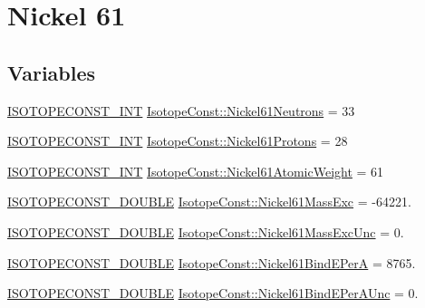\hypertarget{group___isotope_const-_nickel-_ni61}{}\section{Nickel 61}
\label{group___isotope_const-_nickel-_ni61}
\subsection*{Variables}
\begin{DoxyCompactItemize}
\item 
\mbox{\hyperlink{group___isotope_const-_macros_ga5f18360b3e99483a35c32d789e62621c}{I\+S\+O\+T\+O\+P\+E\+C\+O\+N\+S\+T\+\_\+\+I\+NT}} \mbox{\hyperlink{group___isotope_const-_nickel-_ni61_ga8626dd87891448168f6805414d50f250}{Isotope\+Const\+::\+Nickel61\+Neutrons}} = 33
\item 
\mbox{\hyperlink{group___isotope_const-_macros_ga5f18360b3e99483a35c32d789e62621c}{I\+S\+O\+T\+O\+P\+E\+C\+O\+N\+S\+T\+\_\+\+I\+NT}} \mbox{\hyperlink{group___isotope_const-_nickel-_ni61_ga3412e2c2ba4c86a214d26d09ac66b1a2}{Isotope\+Const\+::\+Nickel61\+Protons}} = 28
\item 
\mbox{\hyperlink{group___isotope_const-_macros_ga5f18360b3e99483a35c32d789e62621c}{I\+S\+O\+T\+O\+P\+E\+C\+O\+N\+S\+T\+\_\+\+I\+NT}} \mbox{\hyperlink{group___isotope_const-_nickel-_ni61_ga9b700f35fdee990d4093c7903ba86def}{Isotope\+Const\+::\+Nickel61\+Atomic\+Weight}} = 61
\item 
\mbox{\hyperlink{group___isotope_const-_macros_ga8f45a7272ce02c0b4c65c44636ed719a}{I\+S\+O\+T\+O\+P\+E\+C\+O\+N\+S\+T\+\_\+\+D\+O\+U\+B\+LE}} \mbox{\hyperlink{group___isotope_const-_nickel-_ni61_gab00424df13d407456705c28bd3b260bf}{Isotope\+Const\+::\+Nickel61\+Mass\+Exc}} = -\/64221.
\item 
\mbox{\hyperlink{group___isotope_const-_macros_ga8f45a7272ce02c0b4c65c44636ed719a}{I\+S\+O\+T\+O\+P\+E\+C\+O\+N\+S\+T\+\_\+\+D\+O\+U\+B\+LE}} \mbox{\hyperlink{group___isotope_const-_nickel-_ni61_gaa32318b69b0a60969de7dc98a803461f}{Isotope\+Const\+::\+Nickel61\+Mass\+Exc\+Unc}} = 0.
\item 
\mbox{\hyperlink{group___isotope_const-_macros_ga8f45a7272ce02c0b4c65c44636ed719a}{I\+S\+O\+T\+O\+P\+E\+C\+O\+N\+S\+T\+\_\+\+D\+O\+U\+B\+LE}} \mbox{\hyperlink{group___isotope_const-_nickel-_ni61_ga3ea1ebb5bf32c8526df6e8a1672f2eab}{Isotope\+Const\+::\+Nickel61\+Bind\+E\+PerA}} = 8765.
\item 
\mbox{\hyperlink{group___isotope_const-_macros_ga8f45a7272ce02c0b4c65c44636ed719a}{I\+S\+O\+T\+O\+P\+E\+C\+O\+N\+S\+T\+\_\+\+D\+O\+U\+B\+LE}} \mbox{\hyperlink{group___isotope_const-_nickel-_ni61_ga488e75c746cf6f02c496797a93e80f21}{Isotope\+Const\+::\+Nickel61\+Bind\+E\+Per\+A\+Unc}} = 0.

\end{DoxyCompactItemize}

